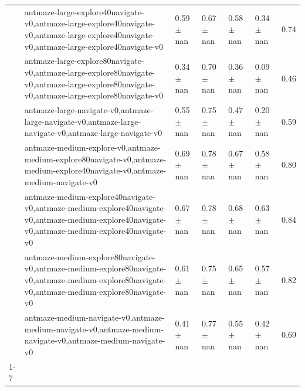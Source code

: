 \begin{tabular}{lllllll}
 & antmaze-large-explore40navigate-v0,antmaze-large-explore40navigate-v0,antmaze-large-explore40navigate-v0,antmaze-large-explore40navigate-v0 & 0.59 $\pm$ nan & 0.67 $\pm$ nan & 0.58 $\pm$ nan & 0.34 $\pm$ nan & 0.74 \\
 & antmaze-large-explore80navigate-v0,antmaze-large-explore80navigate-v0,antmaze-large-explore80navigate-v0,antmaze-large-explore80navigate-v0 & 0.34 $\pm$ nan & 0.70 $\pm$ nan & 0.36 $\pm$ nan & 0.09 $\pm$ nan & 0.46 \\
 & antmaze-large-navigate-v0,antmaze-large-navigate-v0,antmaze-large-navigate-v0,antmaze-large-navigate-v0 & 0.55 $\pm$ nan & 0.75 $\pm$ nan & 0.47 $\pm$ nan & 0.20 $\pm$ nan & 0.59 \\
 & antmaze-medium-explore-v0,antmaze-medium-explore80navigate-v0,antmaze-medium-explore40navigate-v0,antmaze-medium-navigate-v0 & 0.69 $\pm$ nan & 0.78 $\pm$ nan & 0.67 $\pm$ nan & 0.58 $\pm$ nan & 0.80 \\
 & antmaze-medium-explore40navigate-v0,antmaze-medium-explore40navigate-v0,antmaze-medium-explore40navigate-v0,antmaze-medium-explore40navigate-v0 & 0.67 $\pm$ nan & 0.78 $\pm$ nan & 0.68 $\pm$ nan & 0.63 $\pm$ nan & 0.84 \\
 & antmaze-medium-explore80navigate-v0,antmaze-medium-explore80navigate-v0,antmaze-medium-explore80navigate-v0,antmaze-medium-explore80navigate-v0 & 0.61 $\pm$ nan & 0.75 $\pm$ nan & 0.65 $\pm$ nan & 0.57 $\pm$ nan & 0.82 \\
 & antmaze-medium-navigate-v0,antmaze-medium-navigate-v0,antmaze-medium-navigate-v0,antmaze-medium-navigate-v0 & 0.41 $\pm$ nan & 0.77 $\pm$ nan & 0.55 $\pm$ nan & 0.42 $\pm$ nan & 0.69 \\
\cline{1-7}
\bottomrule
\end{tabular}
